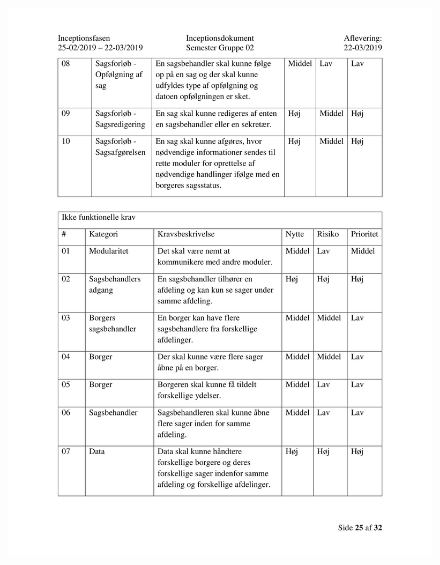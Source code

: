 \begin{figure}[hb]
  \includegraphics[scale = 0.33]{./PNG/Inceptions/Gruppe02+InceptionsDokument-26.jpg} 
\end{figure}

